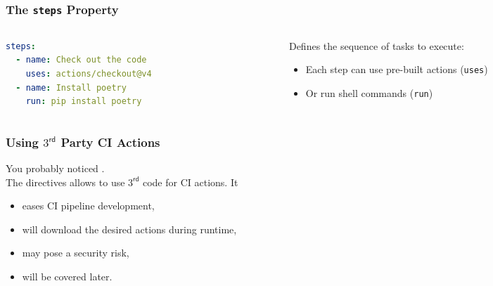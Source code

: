 \begin{frame}[fragile]
	\frametitle{The \texttt{steps} Property}
	\begin{columns}
		\begin{column}{0.5\textwidth}
			\begin{lstlisting}[language=yaml,basicstyle=\small\ttfamily]
steps:
  - name: Check out the code
    uses: actions/checkout@v4
  - name: Install poetry
    run: pip install poetry
			\end{lstlisting}
		\end{column}
		\begin{column}{0.5\textwidth}
			Defines the sequence of tasks to execute:
			\begin{itemize}
				\item Each step can use pre-built actions (\texttt{uses})
				\item Or run shell commands (\texttt{run})
			\end{itemize}
		\end{column}
	\end{columns}
\end{frame}

\begin{frame}[fragile]
	\frametitle{Using $3^\mathsf{rd}$ Party CI Actions}
	You probably noticed .\\
	The  directives allows to use $3^\mathsf{rd}$ code for CI actions. It
	\begin{itemize}[<+->]
		\item eases CI pipeline development,
		\item will download the desired actions during runtime,
		\item may pose a security risk,
		\item will be covered later.
	\end{itemize}
\end{frame}

